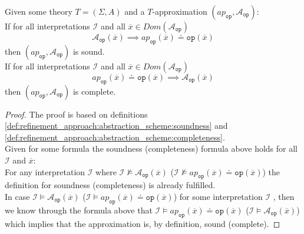 \begin{lemma}
    \label{lemma:refinement_approach:abstraction_scheme:implication}
    Given some theory $T=\left(\Sigma,A\right)$ and a $T$-approximation $\left(ap_{\texttt{op}}, \mathcal{A}_{\texttt{op}}\right)$:\\
    If for all interpretations $\mathcal{I}$ and all $\overline{x}\in Dom\left(\mathcal{A}_{\texttt{op}}\right)$
    \[
        \mathcal{A}_{\texttt{op}}\left(\overline{x}\right) \implies ap_{\texttt{op}}\left(\overline{x}\right) \doteq \texttt{op}\left(\overline{x}\right)
    \]
    then $\left(ap_{\texttt{op}}, \mathcal{A}_{\texttt{op}}\right)$ is sound.\\
    If for all interpretations $\mathcal{I}$ and all $\overline{x}\in Dom\left(\mathcal{A}_{\texttt{op}}\right)$
    \[
        ap_{\texttt{op}}\left(\overline{x}\right) \doteq \texttt{op}\left(\overline{x}\right) \implies \mathcal{A}_{\texttt{op}}\left(\overline{x}\right)
    \]
    then $\left(ap_{\texttt{op}}, \mathcal{A}_{\texttt{op}}\right)$ is complete.
    \begin{proof}
        The proof is based on definitions \ref{def:refinement_approach:abstraction_scheme:soundness} and \ref{def:refinement_approach:abstraction_scheme:completeness}.\\
        Given for some formula the soundness (completeness) formula above holds for all $\mathcal{I}$ and $\overline{x}$:\\
        For any interpretation $\mathcal{I}$ where
            $\mathcal{I}\nvDash\mathcal{A}_{\texttt{op}}\left(\overline{x}\right)$
            ($\mathcal{I}\nvDash ap_{\texttt{op}}\left(\overline{x}\right) \doteq \texttt{op}\left(\overline{x}\right)$)
            the definition for soundness (completeness) is already fulfilled.\\
        In case
            $\mathcal{I}\vDash\mathcal{A}_{\texttt{op}}\left(\overline{x}\right)$
            ($\mathcal{I}\vDash ap_{\texttt{op}}\left(\overline{x}\right) \doteq \texttt{op}\left(\overline{x}\right)$) for some interpretation $\mathcal{I}$  ,
        then we know through the formula above that
            $\mathcal{I}\vDash ap_{\texttt{op}}\left(\overline{x}\right) \doteq \texttt{op}\left(\overline{x}\right)$
            ($\mathcal{I}\vDash\mathcal{A}_{\texttt{op}}\left(\overline{x}\right)$)
        which implies that the approximation is, by definition, sound (complete).


    \end{proof}
\end{lemma}

